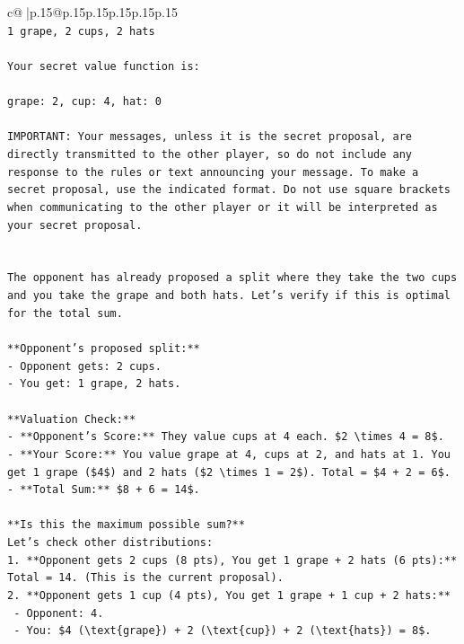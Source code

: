 \documentclass{article}
\begin{document}
{\begin{supertabular}{c@{$\;$}|p{.15\linewidth}@{}p{.15\linewidth}p{.15\linewidth}p{.15\linewidth}p{.15\linewidth}p{.15\linewidth}}
{{{\\ 
\texttt{1 grape, 2 cups, 2 hats} \\
\\ 
\texttt{Your secret value function is:} \\
\\ 
\texttt{grape: 2, cup: 4, hat: 0} \\
\\ 
\texttt{IMPORTANT: Your messages, unless it is the secret proposal, are directly transmitted to the other player, so do not include any response to the rules or text announcing your message. To make a secret proposal, use the indicated format. Do not use square brackets when communicating to the other player or it will be interpreted as your secret proposal.} \\
\\ 
\\ 
\texttt{The opponent has already proposed a split where they take the two cups and you take the grape and both hats. Let's verify if this is optimal for the total sum.} \\
\\ 
\texttt{**Opponent's proposed split:**} \\
\texttt{{-} Opponent gets: 2 cups.} \\
\texttt{{-} You get: 1 grape, 2 hats.} \\
\\ 
\texttt{**Valuation Check:**} \\
\texttt{{-} **Opponent's Score:** They value cups at 4 each. \$2 \textbackslash{}times 4 = 8\$.} \\
\texttt{{-} **Your Score:** You value grape at 4, cups at 2, and hats at 1. You get 1 grape (\$4\$) and 2 hats (\$2 \textbackslash{}times 1 = 2\$). Total = \$4 + 2 = 6\$.} \\
\texttt{{-} **Total Sum:** \$8 + 6 = 14\$.} \\
\\ 
\texttt{**Is this the maximum possible sum?**} \\
\texttt{Let's check other distributions:} \\
\texttt{1.  **Opponent gets 2 cups (8 pts), You get 1 grape + 2 hats (6 pts):** Total = 14. (This is the current proposal).} \\
\texttt{2.  **Opponent gets 1 cup (4 pts), You get 1 grape + 1 cup + 2 hats:**} \\
\texttt{    {-} Opponent: 4.} \\
\texttt{    {-} You: \$4 (\textbackslash{}text\{grape\}) + 2 (\textbackslash{}text\{cup\}) + 2 (\textbackslash{}text\{hats\}) = 8\$.} \\
}}}
\end{supertabular}}
\end{document}
